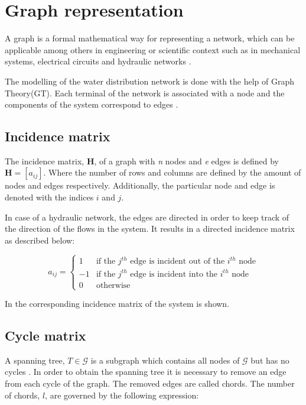 \section{Graph representation}  
\label{GraphTheory}

A graph is a formal mathematical way for representing a network, which can be applicable among others in engineering or scientific context such as in mechanical systems, electrical circuits and hydraulic networks \cite{graph_intro}. 

The modelling of the water distribution network is done with the help of Graph Theory(GT). Each terminal of the network is associated with a node and the components of the system correspond to edges \cite{GraphTheoryCarsten}. 
\subsection{Incidence matrix} 
\label{IncidenceSection}
The incidence matrix, $\pmb{H}$, of a graph with \textit{n} nodes and \textit{e} edges is 
defined by $\pmb{H} = [a_{ij}]$. Where the number of rows and columns are defined by the amount of nodes and edges respectively. 
Additionally, the particular node and edge is denoted with the indices $i$ and 
$j$.

In case of a hydraulic network, the edges are directed in order to keep track of the direction of the flows in the system. It results in a directed incidence matrix as described below:

\begin{equation}
\label{DiGraph}
 a_{ij} =
		\left\{
		\begin{array}{ll}
		
		1 			&      \text{if the $j^{th}$ edge is incident out of the $i^{th}$ node}	
\\
		-1                       &     \text{if the $j^{th}$ edge is incident into the $i^{th}$ node}
\\


                0                       &      \text{otherwise}

		\end{array}
		\right.
\end{equation}	

In  the corresponding incidence matrix of the system is 
shown. 

\subsection{Cycle matrix}
\label{CycleSection}
A spanning tree, $T \in \mathcal{G}$ is a subgraph which contains all nodes of $\mathcal{G}$ but has no cycles \cite{GraphModel}. 
In order to obtain the spanning tree it is necessary to remove an edge from each cycle of the graph. The removed edges are called chords. The number of chords, $l$, are governed by the following expression:

